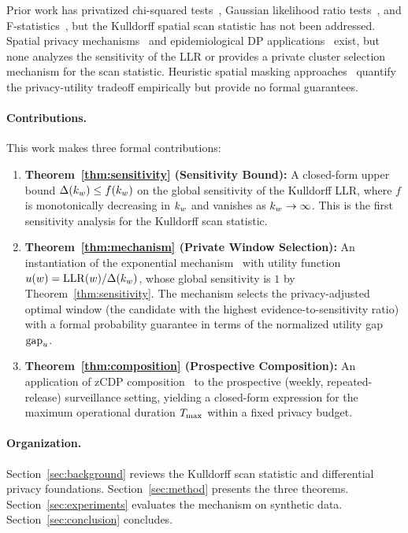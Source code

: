 
Prior work has privatized chi-squared tests~\cite{gaboardi2016}, Gaussian likelihood
ratio tests~\cite{degue2018}, and F-statistics~\cite{alabi2022}, but the Kulldorff
spatial scan statistic has not been addressed.
Spatial privacy mechanisms~\cite{andres2013,machanavajjhala2008} and epidemiological DP
applications~\cite{fan2013} exist, but none analyzes the sensitivity of the LLR
or provides a private cluster selection mechanism for the scan statistic.
Heuristic spatial masking approaches~\cite{olson2006,cassa2006} quantify the
privacy-utility tradeoff empirically but provide no formal guarantees.


\paragraph{Contributions.} This work makes three formal contributions:

\begin{enumerate}
    \item \textbf{Theorem~\ref{thm:sensitivity} (Sensitivity Bound):}
          A closed-form upper bound $\Delta(k_w) \leq f(k_w)$ on the global sensitivity
          of the Kulldorff LLR, where $f$ is monotonically decreasing in $k_w$
          and vanishes as $k_w \to \infty$.
          This is the first sensitivity analysis for the Kulldorff scan statistic.

    \item \textbf{Theorem~\ref{thm:mechanism} (Private Window Selection):}
          An instantiation of the exponential mechanism~\cite{mcsherry2007} with
          utility function $u(w) = \mathrm{LLR}(w)/\Delta(k_w)$, whose global sensitivity is
          $1$ by Theorem~\ref{thm:sensitivity}.
          The mechanism selects the privacy-adjusted optimal window (the candidate
          with the highest evidence-to-sensitivity ratio) with a formal probability
          guarantee in terms of the normalized utility gap $\mathrm{gap}_u$.

    \item \textbf{Theorem~\ref{thm:composition} (Prospective Composition):}
          An application of zCDP composition~\cite{bun2016} to the prospective
          (weekly, repeated-release) surveillance setting, yielding a closed-form
          expression for the maximum operational duration $T_{\max}$ within a fixed
          privacy budget.
\end{enumerate}


\paragraph{Organization.}
Section~\ref{sec:background} reviews the Kulldorff scan statistic and differential
privacy foundations.
Section~\ref{sec:method} presents the three theorems.
Section~\ref{sec:experiments} evaluates the mechanism on synthetic data.
Section~\ref{sec:conclusion} concludes.
